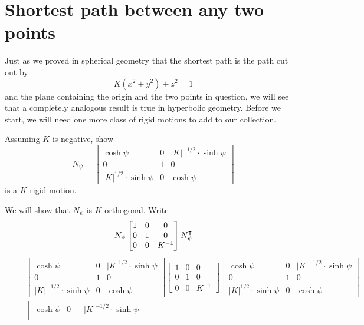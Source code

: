 \documentclass[newpage,hints,handout]{ximera}
\begin{document}
\section{Shortest path between any two points}

Just as we proved in spherical geometry that the shortest path is the
path cut out by
\[
K(x^{2}+y^{2})+z^{2}=1
\]
and the plane containing the origin and the two points in question, we
will see that a completely analogous result is true in hyperbolic
geometry. Before we start, we will need one more class of rigid
motions to add to our collection.


\begin{problem}
  Assuming $K$ is negative, show
  \[
  N_\psi=
  \begin{bmatrix}
    \cosh\psi & 0 & |K|^{-1/2}\cdot\sinh\psi\\
    0 & 1 & 0\\
    |K|^{1/2}\cdot\sinh\psi & 0 & \cosh\psi
  \end{bmatrix}
  \]
  is a $K$-rigid motion.
  \begin{freeResponse}
    We will show that $N_\psi$ is $K$ orthogonal. Write
    \[
    N_\psi
      \begin{bmatrix}
        1 & 0 & 0 \\
        0 & 1 & 0 \\
        0 & 0 & K^{-1}
      \end{bmatrix}
      N_\psi^\intercal
    \]
    \begin{align*}
  &=
      \begin{bmatrix}
    \cosh\psi & 0 & |K|^{1/2}\cdot\sinh\psi\\
    0 & 1 & 0\\
    |K|^{-1/2}\cdot\sinh\psi & 0 & \cosh\psi
      \end{bmatrix}
      \begin{bmatrix}
        1 & 0 & 0 \\
        0 & 1 & 0 \\
        0 & 0 & K^{-1}
      \end{bmatrix}
 \begin{bmatrix}
    \cosh\psi & 0 & |K|^{-1/2}\cdot\sinh\psi\\
    0 & 1 & 0\\
    |K|^{1/2}\cdot\sinh\psi & 0 & \cosh\psi
 \end{bmatrix} \\
&=\begin{bmatrix}
    \cosh\psi & 0 & -|K|^{-1/2}\cdot\sinh\psi\\

\end{bmatrix}
\end{align*}
\end{freeResponse}
\end{problem}
\end{document}
